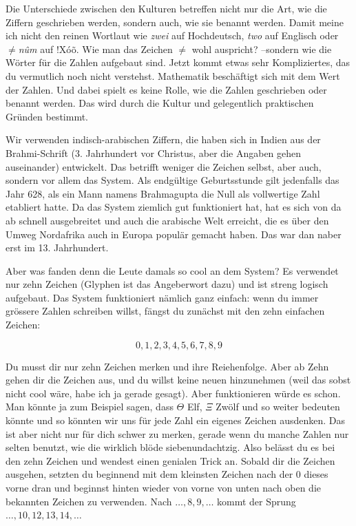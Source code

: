 Die Unterschiede zwischen den Kulturen betreffen nicht nur die Art, wie die Ziffern geschrieben werden, sondern auch, wie sie benannt werden. Damit meine ich nicht den reinen Wortlaut wie \textit{zwei} auf Hochdeutsch, \textit{two} auf Englisch oder \textit{$\neq$n\^{u}m} auf $!$X\'{o}\~{o}. Wie man das Zeichen $\neq$ wohl auspricht? --sondern wie die Wörter für die Zahlen aufgebaut sind. Jetzt kommt etwas sehr Kompliziertes, das du vermutlich noch nicht verstehst. Mathematik beschäftigt sich mit dem Wert der Zahlen. Und dabei spielt es keine Rolle, wie die Zahlen geschrieben oder benannt werden. Das wird durch die Kultur und gelegentlich praktischen Gründen bestimmt.
 

Wir verwenden indisch-arabischen Ziffern, die haben sich in Indien aus der Brahmi-Schrift (3. Jahrhundert vor Christus, aber die Angaben gehen auseinander) entwickelt. Das betrifft weniger die Zeichen selbst, aber auch, sondern vor allem das System.  Als endgültige Geburtsstunde gilt jedenfalls das Jahr 628, als ein Mann namens Brahmagupta die Null als vollwertige Zahl etabliert hatte. Da das System ziemlich gut funktioniert hat, hat es sich von da ab schnell ausgebreitet und auch die arabische Welt erreicht, die es über den Umweg Nordafrika auch in Europa populär gemacht haben. Das war dan naber erst im 13. Jahrhundert.

Aber was fanden denn die Leute damals so cool an dem System? Es verwendet nur zehn Zeichen (Glyphen ist das Angeberwort dazu) und ist streng logisch aufgebaut. Das System funktioniert nämlich ganz einfach: wenn du immer grössere Zahlen schreiben willst, fängst du zunächst mit den zehn einfachen Zeichen:

$$0, 1, 2, 3, 4, 5, 6, 7, 8, 9$$

Du musst dir nur zehn Zeichen merken und ihre Reiehenfolge. Aber ab Zehn gehen dir die Zeichen aus, und du willst keine neuen hinzunehmen (weil das sobst nicht cool wäre, habe ich ja gerade gesagt). Aber funktionieren würde es schon. Man könnte ja zum Beispiel sagen, dass $\Theta$ Elf, $\Xi$ Zwölf und so weiter bedeuten könnte und so könnten wir uns für jede Zahl ein eigenes Zeichen ausdenken. Das ist aber nicht nur für dich schwer zu merken, gerade wenn du manche Zahlen nur selten benutzt, wie die wirklich blöde siebenundachtzig. Also belässt du es bei den zehn Zeichen und wendest einen genialen Trick an. Sobald dir die Zeichen ausgehen, setzten du beginnend mit dem kleinsten Zeichen nach der 0 dieses vorne dran und beginnst hinten wieder von vorne von unten nach oben die bekannten Zeichen zu verwenden. Nach $\dots, 8, 9,\dots$ kommt der Sprung $\dots, 10, 12, 13, 14,\dots$

